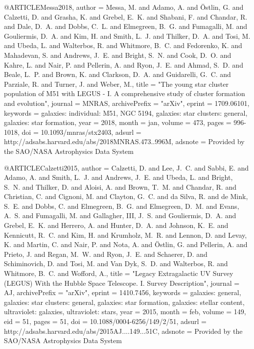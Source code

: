 \documentclass[useAMS,usenatbib]{mnras}
\def\aj{AJ}\def\actaa{Acta Astron.}\def\araa{ARA\&A}\def\apj{ApJ}\def\apjl{ApJ}\def\apjs{ApJS}\def\ao{Appl.~Opt.}\def\apss{Ap\&SS}\def\aap{A\&A}\def\aapr{A\&A~Rev.}\def\aaps{A\&AS}\def\azh{AZh}\def\baas{BAAS}\def\bac{Bull. astr. Inst. Czechosl.}\def\caa{Chinese Astron. Astrophys.}\def\cjaa{Chinese J. Astron. Astrophys.}\def\icarus{Icarus}\def\jcap{J. Cosmology Astropart. Phys.}\def\jrasc{JRASC}\def\mnras{MNRAS}\def\memras{MmRAS}\def\na{New A}\def\nar{New A Rev.}\def\pasa{PASA}\def\pra{Phys.~Rev.~A}\def\prb{Phys.~Rev.~B}\def\prc{Phys.~Rev.~C}\def\prd{Phys.~Rev.~D}\def\pre{Phys.~Rev.~E}\def\prl{Phys.~Rev.~Lett.}\def\pasp{PASP}\def\pasj{PASJ}\def\qjras{QJRAS}\def\rmxaa{Rev. Mexicana Astron. Astrofis.}\def\skytel{S\&T}\def\solphys{Sol.~Phys.}\def\sovast{Soviet~Ast.}\def\ssr{Space~Sci.~Rev.}\def\zap{ZAp}\def\nat{Nature}\def\iaucirc{IAU~Circ.}\def\aplett{Astrophys.~Lett.}\def\apspr{Astrophys.~Space~Phys.~Res.}\def\bain{Bull.~Astron.~Inst.~Netherlands}\def\fcp{Fund.~Cosmic~Phys.}\def\gca{Geochim.~Cosmochim.~Acta}\def\grl{Geophys.~Res.~Lett.}\def\jcp{J.~Chem.~Phys.}\def\jgr{J.~Geophys.~Res.}\def\jqsrt{J.~Quant.~Spec.~Radiat.~Transf.}\def\memsai{Mem.~Soc.~Astron.~Italiana}\def\nphysa{Nucl.~Phys.~A}\def\physrep{Phys.~Rep.}\def\physscr{Phys.~Scr}\def\planss{Planet.~Space~Sci.}\def\procspie{Proc.~SPIE}
\begin{document}
{{{{{{{{{{{{{{{@ARTICLE{Messa2018,
   author = {{Messa}, M. and {Adamo}, A. and {{\"O}stlin}, G. and {Calzetti}, D. and 
	{Grasha}, K. and {Grebel}, E.~K. and {Shabani}, F. and {Chandar}, R. and 
	{Dale}, D.~A. and {Dobbs}, C.~L. and {Elmegreen}, B.~G. and 
	{Fumagalli}, M. and {Gouliermis}, D.~A. and {Kim}, H. and {Smith}, L.~J. and 
	{Thilker}, D.~A. and {Tosi}, M. and {Ubeda}, L. and {Walterbos}, R. and 
	{Whitmore}, B.~C. and {Fedorenko}, K. and {Mahadevan}, S. and 
	{Andrews}, J.~E. and {Bright}, S.~N. and {Cook}, D.~O. and {Kahre}, L. and 
	{Nair}, P. and {Pellerin}, A. and {Ryon}, J.~E. and {Ahmad}, S.~D. and 
	{Beale}, L.~P. and {Brown}, K. and {Clarkson}, D.~A. and {Guidarelli}, G.~C. and 
	{Parziale}, R. and {Turner}, J. and {Weber}, M.},
    title = "{The young star cluster population of M51 with LEGUS - I. A comprehensive study of cluster formation and evolution}",
  journal = {\mnras},
archivePrefix = "arXiv",
   eprint = {1709.06101},
 keywords = {galaxies: individual: M51, NGC 5194, galaxies: star clusters: general, galaxies: star formation},
     year = 2018,
    month = jan,
   volume = 473,
    pages = {996-1018},
      doi = {10.1093/mnras/stx2403},
   adsurl = {http://adsabs.harvard.edu/abs/2018MNRAS.473..996M},
  adsnote = {Provided by the SAO/NASA Astrophysics Data System}
}

@ARTICLE{Calzetti2015,
   author = {{Calzetti}, D. and {Lee}, J.~C. and {Sabbi}, E. and {Adamo}, A. and 
	{Smith}, L.~J. and {Andrews}, J.~E. and {Ubeda}, L. and {Bright}, S.~N. and 
	{Thilker}, D. and {Aloisi}, A. and {Brown}, T.~M. and {Chandar}, R. and 
	{Christian}, C. and {Cignoni}, M. and {Clayton}, G.~C. and {da Silva}, R. and 
	{de Mink}, S.~E. and {Dobbs}, C. and {Elmegreen}, B.~G. and 
	{Elmegreen}, D.~M. and {Evans}, A.~S. and {Fumagalli}, M. and 
	{Gallagher}, III, J.~S. and {Gouliermis}, D.~A. and {Grebel}, E.~K. and 
	{Herrero}, A. and {Hunter}, D.~A. and {Johnson}, K.~E. and {Kennicutt}, R.~C. and 
	{Kim}, H. and {Krumholz}, M.~R. and {Lennon}, D. and {Levay}, K. and 
	{Martin}, C. and {Nair}, P. and {Nota}, A. and {{\"O}stlin}, G. and 
	{Pellerin}, A. and {Prieto}, J. and {Regan}, M.~W. and {Ryon}, J.~E. and 
	{Schaerer}, D. and {Schiminovich}, D. and {Tosi}, M. and {Van Dyk}, S.~D. and 
	{Walterbos}, R. and {Whitmore}, B.~C. and {Wofford}, A.},
    title = "{Legacy Extragalactic UV Survey (LEGUS) With the Hubble Space Telescope. I. Survey Description}",
  journal = {\aj},
archivePrefix = "arXiv",
   eprint = {1410.7456},
 keywords = {galaxies: general, galaxies: star clusters: general, galaxies: star formation, galaxies: stellar content, ultraviolet: galaxies, ultraviolet: stars},
     year = 2015,
    month = feb,
   volume = 149,
      eid = {51},
    pages = {51},
      doi = {10.1088/0004-6256/149/2/51},
   adsurl = {http://adsabs.harvard.edu/abs/2015AJ....149...51C},
  adsnote = {Provided by the SAO/NASA Astrophysics Data System}
}

}}}}}}}}}}}}}}}
\end{document}
